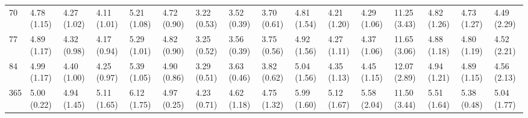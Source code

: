 \begin{tabular}{llllllllllllllll}
70  &  4.78 (1.15) &  4.27 (1.02) &  4.11 (1.01) &  5.21 (1.08) &  4.72 (0.90) &  3.22 (0.53) &  3.52 (0.39) &  3.70 (0.61) &  4.81 (1.54) &  4.21 (1.20) &  4.29 (1.06) &  11.25 (3.43) &  4.82 (1.26) &  4.73 (1.27) &  4.49 (2.29) \\
77  &  4.89 (1.17) &  4.32 (0.98) &  4.17 (0.94) &  5.29 (1.01) &  4.82 (0.90) &  3.25 (0.52) &  3.56 (0.39) &  3.75 (0.56) &  4.92 (1.56) &  4.27 (1.11) &  4.37 (1.06) &  11.65 (3.06) &  4.88 (1.18) &  4.80 (1.19) &  4.52 (2.21) \\
84  &  4.99 (1.17) &  4.40 (1.00) &  4.25 (0.97) &  5.39 (1.05) &  4.90 (0.86) &  3.29 (0.51) &  3.63 (0.46) &  3.82 (0.62) &  5.04 (1.56) &  4.35 (1.13) &  4.45 (1.15) &  12.07 (2.89) &  4.94 (1.21) &  4.89 (1.15) &  4.56 (2.13) \\
365 &  5.00 (0.22) &  4.94 (1.45) &  5.11 (1.65) &  6.12 (1.75) &  4.97 (0.25) &  4.23 (0.71) &  4.62 (1.18) &  4.75 (1.32) &  5.99 (1.60) &  5.12 (1.67) &  5.58 (2.04) &  11.50 (3.44) &  5.51 (1.64) &  5.38 (0.48) &  5.04 (1.77) \\
\bottomrule
\end{tabular}
